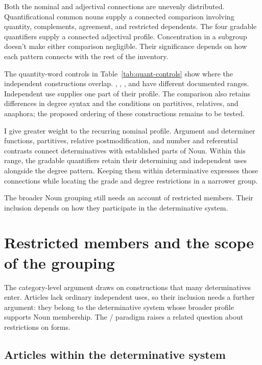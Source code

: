 \documentclass[12pt]{article}
\begin{document}
Both the nominal and adjectival connections are unevenly distributed. Quantificational common nouns supply a connected comparison involving quantity, complements, agreement, and restricted dependents. The four gradable quantifiers supply a connected adjectival profile. Concentration in a subgroup doesn't make either comparison negligible. Their significance depends on how each pattern connects with the rest of the inventory.

The quantity-word controls in Table~\ref{tab:quant-controls} show where the independent constructions overlap. , , , and  have different documented ranges. Independent use supplies one part of their profile. The comparison also retains differences in degree syntax and the conditions on partitives, relatives, and anaphora; the proposed ordering of these constructions remains to be tested.

I give greater weight to the recurring nominal profile. Argument and determiner functions, partitives, relative postmodification, and number and referential contrasts connect determinatives with established parts of Noun. Within this range, the gradable quantifiers retain their determining and independent uses alongside the degree pattern. Keeping them within determinative expresses those connections while locating the grade and degree restrictions in a narrower group.

The broader Noun grouping still needs an account of restricted members. Their inclusion depends on how they participate in the determinative system.

\section{Restricted members and the scope of the grouping}\label{sec:articles}

The category-level argument draws on constructions that many determinatives enter. Articles lack ordinary independent uses, so their inclusion needs a further argument: they belong to the determinative system whose broader profile supports Noun membership. The / paradigm raises a related question about restrictions on forms.

\subsection{Articles within the determinative system}\label{sec:article-membership}
\end{document}
